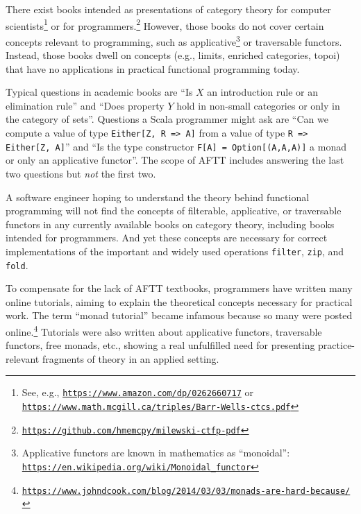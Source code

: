 There exist books intended as presentations of category theory for
computer scientists\footnote{See, e.g., \texttt{\href{https://www.amazon.com/dp/0262660717}{https://www.amazon.com/dp/0262660717}}
or \texttt{\href{https://www.math.mcgill.ca/triples/Barr-Wells-ctcs.pdf}{https://www.math.mcgill.ca/triples/Barr-Wells-ctcs.pdf}}} or for programmers.\footnote{\texttt{\href{https://github.com/hmemcpy/milewski-ctfp-pdf}{https://github.com/hmemcpy/milewski-ctfp-pdf}}}
However, those books do not cover certain concepts relevant to programming,
such as applicative\footnote{Applicative functors are known in mathematics as \textsf{``}monoidal\textsf{''}: \texttt{\href{https://en.wikipedia.org/wiki/Monoidal_functor}{https://en.wikipedia.org/wiki/Monoidal\_functor}}}
or traversable functors. Instead, those books dwell on concepts (e.g.,
limits, enriched categories, topoi) that have no applications in practical
functional programming today.

Typical questions in academic books are \textsf{``}Is $X$ an introduction
rule or an elimination rule\textsf{''} and \textsf{``}Does property $Y$ hold in non-small
categories or only in the category of sets\textsf{''}. Questions a Scala programmer
might ask are \textsf{``}Can we compute a value of type \lstinline!Either[Z, R => A]!
from a value of type \lstinline!R => Either[Z, A]!\textsf{''} and \textsf{``}Is the
type constructor \lstinline!F[A] = Option[(A,A,A)]! a monad or only
an applicative functor\textsf{''}. The scope of AFTT includes answering the
last two questions but \emph{not} the first two.

A software engineer hoping to understand the theory behind functional
programming will not find the concepts of filterable, applicative,
or traversable functors in any currently available books on category
theory, including books intended for programmers. And yet these concepts
are necessary for correct implementations of the important and widely
used operations \lstinline!filter!, \lstinline!zip!, and \lstinline!fold!.

To compensate for the lack of AFTT textbooks, programmers have written
many online tutorials, aiming to explain the theoretical concepts
necessary for practical work. The term \textsf{``}monad tutorial\textsf{''} became
infamous because so many were  posted online.\footnote{\texttt{\href{https://www.johndcook.com/blog/2014/03/03/monads-are-hard-because/}{https://www.johndcook.com/blog/2014/03/03/monads-are-hard-because/}}}
Tutorials were also written about applicative functors, traversable
functors, free monads, etc., showing a real unfulfilled need for presenting
practice-relevant fragments of theory in an applied setting. 


